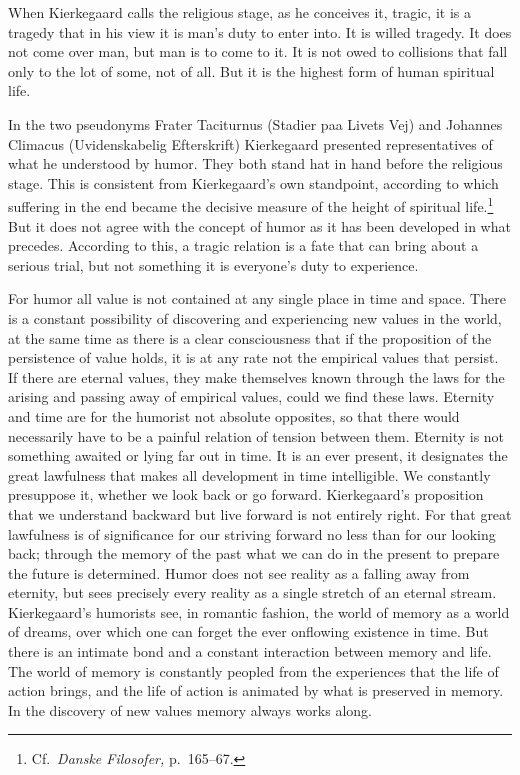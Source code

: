 \documentclass[12pt]{book}
\newcommand{\opage}[1]{\marginnote{\footnotesize\textit{[#1]}}}
\begin{document}
When Kierkegaard calls the religious stage, as he conceives it, tragic, it is a tragedy
that in his \opage{106}view it is man's duty to enter into. It is willed tragedy. It does
not come over man, but man is to come to it. It is not owed to collisions that fall only
to the lot of some, not of all. But it is the highest form of human spiritual life.

In the two pseudonyms Frater Taciturnus (Stadier paa Livets Vej) and Johannes Climacus
(Uvidenskabelig Efterskrift) Kierkegaard presented representatives of what he understood
by humor. They both stand hat in hand before the religious stage. This is consistent from
Kierkegaard's own standpoint, according to which suffering in the end became the decisive
measure of the height of spiritual life.\footnote{Cf.\ \textit{Danske Filosofer,}
p.~165--67.} But it does not agree with the concept of humor as it has been developed in
what precedes. According to this, a tragic relation is a fate that can bring about a
serious trial, but not something it is everyone's duty to experience.

For humor all value is not contained at any single place in time and space. There is a
constant possibility of discovering and experiencing new values in the world, at the same
time as there is a clear consciousness that if the proposition of the persistence of value
holds, it is at any rate not the empirical values that persist. If there are eternal
values, they make themselves known through the laws for the arising and passing away of
empirical values, could we find these laws. Eternity and time are for the humorist not
absolute opposites, so that there would necessarily have to be a painful relation of
tension between them. Eternity is not something awaited or lying far out in time. It is an
ever present, it designates the great lawfulness that makes all development in time
intelligible. We constantly presuppose it, whether we look back or go forward.
Kierkegaard's proposition that we understand backward but live forward is not entirely
right. For that great lawfulness is of significance for our striving forward no less than
for our looking back; through the memory of the past what we can do in the present to
prepare the future is determined. Humor does not see reality as a falling away from
eternity, but sees precisely every reality as a single stretch of an eternal stream.
Kierkegaard's humorists see, in romantic fashion, the world of memory \opage{107}as a
world of dreams, over which one can forget the ever onflowing existence in time. But there
is an intimate bond and a constant interaction between memory and life. The world of memory
is constantly peopled from the experiences that the life of action brings, and the life of
action is animated by what is preserved in memory. In the discovery of new values memory
always works along.
\end{document}
